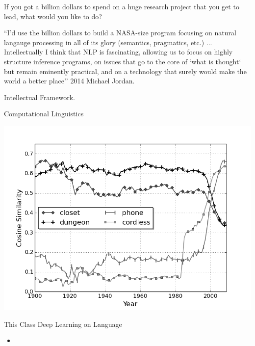 \documentclass{beamer}
\begin{document}
\begin{frame}
  If you got a billion dollars to spend on a huge research project that you get to lead, what would you like to do? 
  
  ``I'd use the billion dollars to build a NASA-size program focusing on natural langauge processing in all of its glory (semantics, pragmatics, etc.) ... Intellectually I think that NLP is fascinating, allowing us to focus on highly structure inference programs, on issues that go to the core of `what is thought` but remain eminently practical, and on a technology that surely would make the world a better place'' 
  2014 Michael Jordan. 
\end{frame}

\begin{frame}{Intellectual Framework.}
  
\end{frame}

\begin{frame}{Computational Linguistics}
  
\end{frame}


\begin{frame}
  \includegraphics{cell}
\end{frame}
\begin{frame}{This Class}
  Deep Learning on Language 

  \begin{itemize}
  \item 
  \end{itemize}
  
\end{frame}
\end{document}
